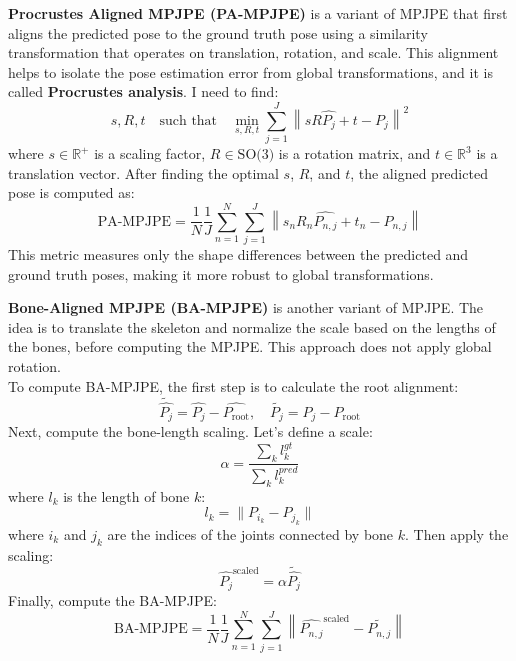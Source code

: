 \textbf{Procrustes Aligned MPJPE (PA-MPJPE)} is a variant of MPJPE that first aligns the predicted pose to the ground truth pose using a similarity transformation that operates on translation, rotation, and scale. 
This alignment helps to isolate the pose estimation error from global transformations, and it is called \textbf{Procrustes analysis}. I need to find:
\begin{equation}
    s,R,t \quad \text{such that} \quad \min_{s,R,t} \sum_{j=1}^{J} \left\|s R \hat{P_j} + t - P_j \right\|^2
\end{equation}
where \(s \in \mathbb{R}^+\) is a scaling factor, \(R \in \text{SO(3)}\) is a rotation matrix, and \(t \in \mathbb{R}^3\) is a translation vector. After finding the optimal \(s\), \(R\), and \(t\), the aligned predicted pose is computed as:
\begin{equation}
    \text{PA-MPJPE} = \frac{1}{N} \frac{1}{J} \sum_{n=1}^{N} \sum_{j=1}^{J} \left\| s_n R_n \hat{P_{n,j}} + t_n - P_{n,j} \right\|
\end{equation}
This metric measures only the shape differences between the predicted and ground truth poses, making it more robust to global transformations.

\textbf{Bone-Aligned MPJPE (BA-MPJPE)} is another variant of MPJPE. The idea is to translate the skeleton and normalize the scale based on the lengths of the bones, before computing the MPJPE. This approach does not apply global rotation.\\
To compute BA-MPJPE, the first step is to calculate the root alignment:
\begin{equation}
    \tilde{\hat{P_j}} = \hat{P_j} - \hat{P_{\text{root}}}, \quad \tilde{P_j} = P_j - P_{\text{root}}
\end{equation}
Next, compute the bone-length scaling. Let's define a scale:
\begin{equation}
    \alpha = \frac{\sum_{k} l_k^{gt}}{\sum_{k} l_k^{pred}}
\end{equation}
where \(l_k\) is the length of bone \(k\):
\begin{equation}
    l_k = \| P_{i_k} - P_{j_k} \|
\end{equation}
where \(i_k\) and \(j_k\) are the indices of the joints connected by bone \(k\). Then apply the scaling:
\begin{equation}
    \hat{P_j}^{\text{scaled}} = \alpha \tilde{\hat{P_j}}
\end{equation}
Finally, compute the BA-MPJPE:
\begin{equation}
    \text{BA-MPJPE} = \frac{1}{N} \frac{1}{J} \sum_{n=1}^{N} \sum_{j=1}^{J} \left\| \hat{P_{n,j}}^{\text{scaled}} - \tilde{P_{n,j}} \right\|
\end{equation}

